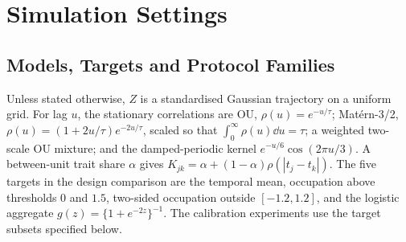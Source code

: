 \section{Simulation Settings}
\label{sec:appendix-simulations}

\subsection{Models, Targets and Protocol Families}

Unless stated otherwise, $Z$ is a standardised Gaussian trajectory on a
uniform grid. For lag $u$, the stationary correlations are OU,
$\rho(u)=e^{-u/\tau}$; Mat\'ern-3/2,
$\rho(u)=(1+2u/\tau)e^{-2u/\tau}$, scaled so that
$\int_0^\infty \rho(u)\dd u=\tau$; a weighted two-scale OU mixture; and the
damped-periodic kernel $e^{-u/6}\cos(2\pi u/3)$. A between-unit trait share
$\alpha$ gives
$K_{jk}=\alpha+(1-\alpha)\rho(|t_j-t_k|)$. The five targets in the design
comparison are the temporal mean, occupation above thresholds $0$ and $1.5$,
two-sided occupation outside $[-1.2,1.2]$, and the logistic aggregate
$g(z)=\{1+e^{-2z}\}^{-1}$. The calibration experiments use the target subsets
specified below.

